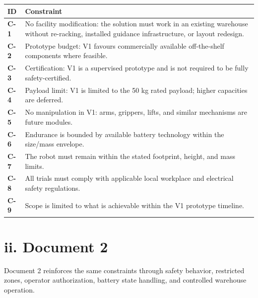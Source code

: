 \begin{table}[H]
\centering
\begin{tabularx}{\textwidth}{>{\bfseries}L{0.12\textwidth}Y}
\toprule
ID & Constraint \\
\midrule
C-1 & No facility modification: the solution must work in an existing warehouse without re-racking, installed guidance infrastructure, or layout redesign. \\
C-2 & Prototype budget: V1 favours commercially available off-the-shelf components where feasible. \\
C-3 & Certification: V1 is a supervised prototype and is not required to be fully safety-certified. \\
C-4 & Payload limit: V1 is limited to the 50 kg rated payload; higher capacities are deferred. \\
C-5 & No manipulation in V1: arms, grippers, lifts, and similar mechanisms are future modules. \\
C-6 & Endurance is bounded by available battery technology within the size/mass envelope. \\
C-7 & The robot must remain within the stated footprint, height, and mass limits. \\
C-8 & All trials must comply with applicable local workplace and electrical safety regulations. \\
C-9 & Scope is limited to what is achievable within the V1 prototype timeline. \\
\bottomrule
\end{tabularx}
\end{table}

\section*{ii. Document 2}

Document 2 reinforces the same constraints through safety behavior, restricted zones, operator authorization, battery state handling, and controlled warehouse operation.
